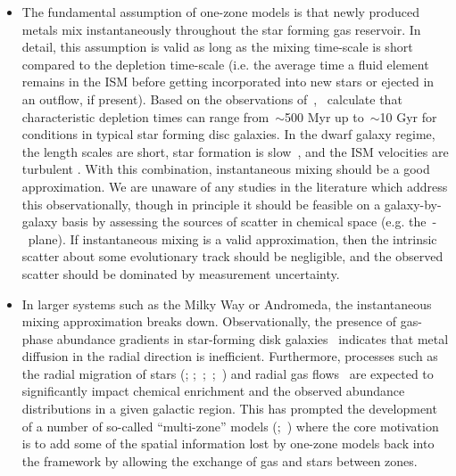 \documentclass[ms.tex]{subfiles}
\begin{document}
\begin{itemize}	

	\item The fundamental assumption of one-zone models is that newly produced
	metals mix instantaneously throughout the star forming gas reservoir.
	In detail, this assumption is valid as long as the mixing time-scale
	is short compared to the depletion time-scale (i.e. the average time a
	fluid element remains in the ISM before getting incorporated into new
	stars or ejected in an outflow, if present).
	Based on the observations of~\citet{Leroy2008},~\citet*{Weinberg2017}
	calculate that characteristic depletion times can range from~$\sim$500 Myr
	up to~$\sim$10 Gyr for conditions in typical star forming disc galaxies.
	In the dwarf galaxy regime, the length scales are short, star formation
	is slow~\citep{Hudson2015}, and the ISM velocities are turbulent
	\citep{Dutta2009, Stilp2013, Schleicher2016}.
	With this combination, instantaneous mixing should be a good approximation.
	We are unaware of any studies in the literature which address this
	observationally, though in principle it should be feasible on a
	galaxy-by-galaxy basis by assessing the sources of scatter in chemical
	space (e.g. the~\afe-\feh~plane).
	If instantaneous mixing is a valid approximation, then the intrinsic
	scatter about some evolutionary track should be negligible, and the
	observed scatter should be dominated by measurement uncertainty.

	\item In larger systems such as the Milky Way or Andromeda, the
	instantaneous mixing approximation breaks down.
	Observationally, the presence of gas-phase abundance gradients in
	star-forming disk galaxies~\citep*[see, e.g., recent reviews
	by][]{Kewley2019, Maiolino2019, Sanchez2020} indicates that metal diffusion
	in the radial direction is inefficient.
	Furthermore, processes such as the radial migration of stars
	(\citealp{Sellwood2002, Roskar2008a, Roskar2008b, Loebman2011, Minchev2011};
	\citealp*{Bird2012};~\citealp{Bird2013};~\citealp*{Grand2012a, Grand2012b,
	Kubryk2013};~\citealp{Okalidis2022}) and radial gas flows~\citep{Lacey1985,
	Bilitewski2012, Vincenzo2020, Sharda2021} are expected to significantly
	impact chemical enrichment and the observed abundance distributions in a
	given galactic region.
	This has prompted the development of a number of so-called ``multi-zone''
	models (\citealp*{Minchev2013, Minchev2014};~\citealp{Minchev2017,
	Johnson2021, Chen2022}) where the core motivation is to add some of the
	spatial information lost by one-zone models back into the framework by
	allowing the exchange of gas and stars between zones.


\end{itemize}
\end{document}
